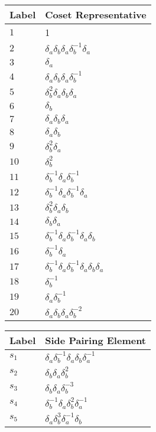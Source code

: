 \documentclass{article}
\begin{document}

\begin{center}
\begin{tabular}{ll}
\toprule
Label & Coset Representative\\
\midrule
$1$ & 1 \\
$2$ & $\delta_a^{}\delta_b^{}\delta_a^{}\delta_b^{-1}\delta_a^{}$ \\
$3$ & $\delta_a^{}$ \\
$4$ & $\delta_a^{}\delta_b^{}\delta_a^{}\delta_b^{-1}$ \\
$5$ & $\delta_b^{2}\delta_a^{}\delta_b^{}\delta_a^{}$ \\
$6$ & $\delta_b^{}$ \\
$7$ & $\delta_a^{}\delta_b^{}\delta_a^{}$ \\
$8$ & $\delta_a^{}\delta_b^{}$ \\
$9$ & $\delta_b^{2}\delta_a^{}$ \\
$10$ & $\delta_b^{2}$ \\
$11$ & $\delta_b^{-1}\delta_a^{}\delta_b^{-1}$ \\
$12$ & $\delta_b^{-1}\delta_a^{}\delta_b^{-1}\delta_a^{}$ \\
$13$ & $\delta_b^{2}\delta_a^{}\delta_b^{}$ \\
$14$ & $\delta_b^{}\delta_a^{}$ \\
$15$ & $\delta_b^{-1}\delta_a^{}\delta_b^{-1}\delta_a^{}\delta_b^{}$ \\
$16$ & $\delta_b^{-1}\delta_a^{}$ \\
$17$ & $\delta_b^{-1}\delta_a^{}\delta_b^{-1}\delta_a^{}\delta_b^{}\delta_a^{}$ 
\\
$18$ & $\delta_b^{-1}$ \\
$19$ & $\delta_a^{}\delta_b^{-1}$ \\
$20$ & $\delta_a^{}\delta_b^{}\delta_a^{}\delta_b^{-2}$ \\
\bottomrule
\end{tabular}
\hfill
\begin{tabular}{ll}
\toprule
Label & Side Pairing Element\\
\midrule
$s_{1}$ & $\delta_a^{}\delta_b^{-1}\delta_a^{}\delta_b^{}\delta_a^{-1}$ \\
$s_{2}$ & $\delta_b^{}\delta_a^{}\delta_b^{2}$ \\
$s_{3}$ & $\delta_b^{}\delta_a^{}\delta_b^{-3}$ \\
$s_{4}$ & $\delta_b^{-1}\delta_a^{}\delta_b^{2}\delta_a^{-1}$ \\
$s_{5}$ & $\delta_a^{}\delta_b^{3}\delta_a^{-1}\delta_b^{}$ \\

\end{tabular}
\end{center}
\end{document}
